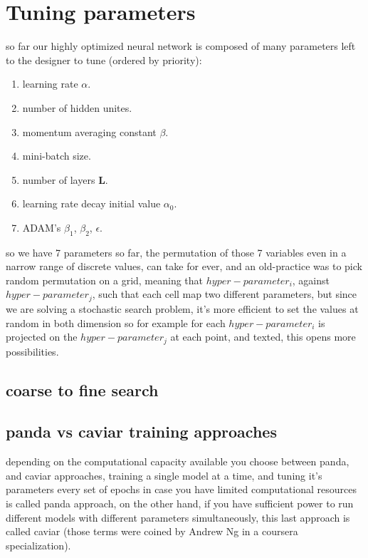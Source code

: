 \documentclass[4apaper,12pt]{book}
\begin{document}
\section{Tuning parameters}
\begin{description}
\item so far our highly optimized neural network is composed of many parameters left to the designer to tune (ordered by priority):
  \begin{enumerate}
\item learning rate \textbf{$\alpha$}.
\item number of hidden unites.
\item momentum averaging constant \textbf{$\beta$}.
\item mini-batch size.
\item number of layers \textbf{L}.
\item learning rate decay initial value \textbf{$\alpha_0$}.
\item ADAM's $\beta_1$, $\beta_2$, $\epsilon$.
  \end{enumerate}
\item so we have 7 parameters so far, the permutation of those 7 variables even in a narrow range of discrete values, can take for ever, and an old-practice was to pick random permutation on a grid, meaning that $hyper-parameter_i$, against $hyper-parameter_j$, such that each cell map two different parameters, but since we are solving a stochastic search problem, it's more efficient to set the values at random in both dimension so for example for each $hyper-parameter_i$  is projected on the $hyper-parameter_j$ at each point, and texted, this opens more possibilities.

 \subsection{coarse to fine search}
  \subsection{panda vs caviar training approaches}
  \begin{description}
  \item depending on the computational capacity available you choose between panda, and caviar approaches, training a single model at a time, and tuning it's parameters every set of epochs in case you have limited computational resources is called panda approach, on the other hand, if you have sufficient power to run different models with different parameters simultaneously, this last approach is called caviar (those terms were coined by Andrew Ng in a coursera specialization).
  \end{description}
  \end{description}
\end{document}
